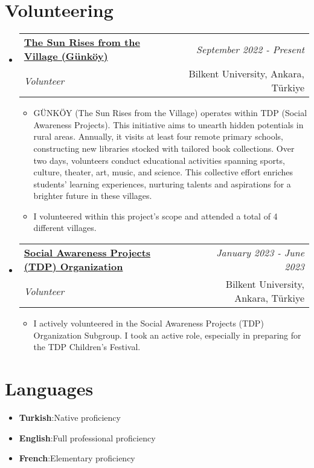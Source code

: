 \documentclass[a4paper,11pt]{article}
\makeatletter
\newcommand{\resumeItem}[2]{
    \item{\textbf{#1}{:\hspace{0.5mm}#2 \vspace{-0.5mm}}}
}
\newcommand{\resumeSubheading}[4]{
\vspace{0.5mm}\item
    \begin{tabular*}{0.98\textwidth}[t]{l@{\extracolsep{\fill}}r}
    \textbf{#1} & \textit{\footnotesize{#4}} \\
    \textit{\footnotesize{#3}} &  \footnotesize{#2} \\
    \end{tabular*}\vspace{-2.4mm}
}
\newcommand{\resumeSubItem}[2]{\resumeItem{#1}{#2}\vspace{-4pt}}
\newcommand{\resumeSubHeadingListStart}{\begin{itemize}[leftmargin=*,labelsep=0mm]}
\newcommand{\resumeHeadingSkillStart}{\begin{itemize}[leftmargin=*,itemsep=1.7mm, rightmargin=2ex]}
\newcommand{\resumeItemListStart}{\begin{justify}\begin{itemize}[leftmargin=3ex, rightmargin=2ex, noitemsep,labelsep=1.2mm,itemsep=0mm]\small}
\newcommand{\resumeSubHeadingListEnd}{\end{itemize}\vspace{2mm}}
\newcommand{\resumeHeadingSkillEnd}{\end{itemize}\vspace{-2mm}}
\newcommand{\resumeItemListEnd}{\end{itemize}\end{justify}\vspace{-2mm}}
\makeatother
\begin{document}

\section{\textbf{Volunteering}}
    \resumeSubHeadingListStart
        \resumeSubheading
            {\href{https://w3.bilkent.edu.tr/www/ogrenci-dekanligi/toplumsal-duyarlilik-projeleri/}{The Sun Rises from the Village (Günköy)}}{Bilkent University, Ankara, Türkiye}
            {Volunteer}{September 2022 - Present}
                \resumeItemListStart
                    \item GÜNKÖY (The Sun Rises from the Village) operates within TDP (Social Awareness Projects). This initiative aims to unearth hidden potentials in rural areas. Annually, it visits at least four remote primary schools, constructing new libraries stocked with tailored book collections. Over two days, volunteers conduct educational activities spanning sports, culture, theater, art, music, and science. This collective effort enriches students' learning experiences, nurturing talents and aspirations for a brighter future in these villages.
                    \item {I volunteered within this project's scope and attended a total of 4 different villages.}
                \resumeItemListEnd
        \resumeSubheading
            {\href{https://w3.bilkent.edu.tr/www/ogrenci-dekanligi/toplumsal-duyarlilik-projeleri/}{Social Awareness Projects (TDP) Organization}}{Bilkent University, Ankara, Türkiye}
            {Volunteer}{January 2023 - June 2023}
                \resumeItemListStart
                    \item I actively volunteered in the Social Awareness Projects (TDP) Organization Subgroup. I took an active role, especially in preparing for the TDP Children’s Festival.
                \resumeItemListEnd
    \resumeSubHeadingListEnd
\vspace{-6.5mm}


\section{\textbf{Languages}}
    \resumeHeadingSkillStart
        \resumeSubItem{Turkish} {Native proficiency}
        \resumeSubItem{English} {Full professional proficiency}
        \resumeSubItem{French} {Elementary proficiency}
    \resumeHeadingSkillEnd
\end{document}
